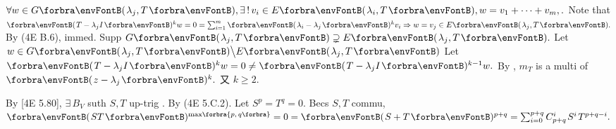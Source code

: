 $\forall w\in G\Par{\lambda_j,T},\exists\,!\,v_i\in E\Par{\lambda_i,T},w=v_1+\dots+v_m,.$\parSol{}
Note that $\Par{T-\lambda_jI}{^k}w=0=\sum_{i=1}^m\Par{\lambda_i-\lambda_j}{^k}v_i\Rightarrow w=v_j\in E\Par{\lambda_j,T}.$\PfEnd\vspace{3pt}\parSol{}
\Or By (4E B.6), immed. \;\Or Supp $G\Par{\lambda_j,T}\supsetneq E\Par{\lambda_j,T}.$ Let $w\in G\Par{\lambda_j,T}\Backslash E\Par{\lambda_j,T}$\parSol{}
Let $\Par{T-\lambda_jI}{^k}w=0\neq\Par{T-\lambda_jI}{^{k-1}}w.$ By , $m_T$ is a multi of $\Par{z-\lambda_j}{^k}.$ 又 $k\geqslant 2.$\PfEnd
\SepLine

By [4E 5.80], $\exists\,B_V$ suth $S,T$ up-trig . By (4E 5.C.2).\PfEnd\vspace{2pt}\parSol{}
\Or Let $S^p=T^q=0.$ Becs $S,T$ commu, $\Par{ST}{^{\max\!\Bra[\scriptsize]{p,\,q}}}=0=\Par{S+T}{^{p+q}}=\sum_{i=0}^{p+q}\mathC_{p+q}^i\;\!S^i\;\!T^{p+q-i}.$\PfEndB
\SepLine



